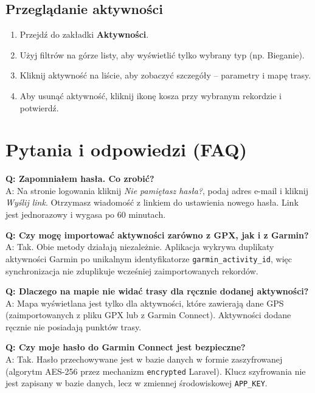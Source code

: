 \documentclass[12pt,a4paper]{report}
\begin{document}
\subsection{Przeglądanie aktywności}

\begin{enumerate}[noitemsep]
    \item Przejdź do zakładki \textbf{Aktywności}.
    \item Użyj filtrów na górze listy, aby wyświetlić tylko wybrany typ (np. Bieganie).
    \item Kliknij aktywność na liście, aby zobaczyć szczegóły -- parametry i mapę trasy.
    \item Aby usunąć aktywność, kliknij ikonę kosza przy wybranym rekordzie i potwierdź.
\end{enumerate}

\section{Pytania i odpowiedzi (FAQ)}

\textbf{Q: Zapomniałem hasła. Co zrobić?} \\
A: Na stronie logowania kliknij \textit{Nie pamiętasz hasła?}, podaj adres e-mail i kliknij \textit{Wyślij link}. Otrzymasz wiadomość z linkiem do ustawienia nowego hasła. Link jest jednorazowy i wygasa po 60 minutach.

\vspace{0.5em}
\textbf{Q: Czy mogę importować aktywności zarówno z GPX, jak i z Garmin?} \\
A: Tak. Obie metody działają niezależnie. Aplikacja wykrywa duplikaty aktywności Garmin po unikalnym identyfikatorze \texttt{garmin\_activity\_id}, więc synchronizacja nie zduplikuje wcześniej zaimportowanych rekordów.

\vspace{0.5em}
\textbf{Q: Dlaczego na mapie nie widać trasy dla ręcznie dodanej aktywności?} \\
A: Mapa wyświetlana jest tylko dla aktywności, które zawierają dane GPS (zaimportowanych z pliku GPX lub z Garmin Connect). Aktywności dodane ręcznie nie posiadają punktów trasy.

\vspace{0.5em}
\textbf{Q: Czy moje hasło do Garmin Connect jest bezpieczne?} \\
A: Tak. Hasło przechowywane jest w bazie danych w formie zaszyfrowanej (algorytm AES-256 przez mechanizm \texttt{encrypted} Laravel). Klucz szyfrowania nie jest zapisany w bazie danych, lecz w zmiennej środowiskowej \texttt{APP\_KEY}.
\end{document}

